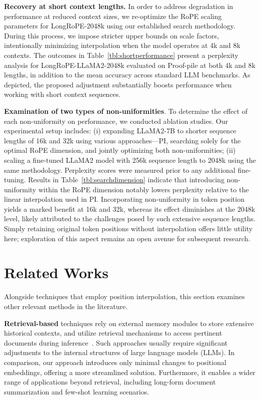 \textbf{Recovery at short context lengths.} In order to address degradation in performance at reduced context sizes, we re-optimize the RoPE scaling parameters for LongRoPE-2048k using our established search methodology. During this process, we impose stricter upper bounds on scale factors, intentionally minimizing interpolation when the model operates at 4k and 8k contexts. The outcomes in Table~\ref{tbl:shortperformance} present a perplexity analysis for LongRoPE-LLaMA2-2048k evaluated on Proof-pile at both 4k and 8k lengths, in addition to the mean accuracy across standard LLM benchmarks. As depicted, the proposed adjustment substantially boosts performance when working with short context sequences.

\textbf{Examination of two types of non-uniformities}. To determine the effect of each non-uniformity on performance, we conducted ablation studies. Our experimental setup includes: (i) expanding LLaMA2-7B to shorter sequence lengths of 16k and 32k using various approaches—PI, searching solely for the optimal RoPE dimension, and jointly optimizing both non-uniformities; (ii) scaling a fine-tuned LLaMA2 model with 256k sequence length to 2048k using the same methodology. Perplexity scores were measured prior to any additional fine-tuning. Results in Table~\ref{tbl:searchdimension} indicate that introducing non-uniformity within the RoPE dimension notably lowers perplexity relative to the linear interpolation used in PI. Incorporating non-uniformity in token position yields a marked benefit at 16k and 32k, whereas its effect diminishes at the 2048k level, likely attributed to the challenges posed by such extensive sequence lengths. Simply retaining original token positions without interpolation offers little utility here; exploration of this aspect remains an open avenue for subsequent research.

\section{Related Works}

Alongside techniques that employ position interpolation, this section examines other relevant methods in the literature.

\textbf{Retrieval-based} techniques rely on external memory modules to store extensive historical contexts, and utilize retrieval mechanisms to access pertinent documents during inference~\cite{longllama,wang2023augmenting,borgeaud2022improving}. Such approaches usually require significant adjustments to the internal structures of large language models (LLMs). In comparison, our approach introduces only minimal changes to positional embeddings, offering a more streamlined solution. Furthermore, it enables a wider range of applications beyond retrieval, including long-form document summarization and few-shot learning scenarios.

